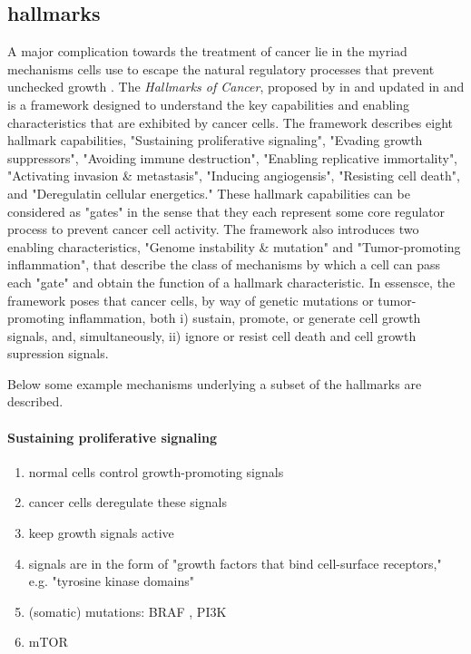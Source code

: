 \subsection{hallmarks}
A major complication towards the treatment of cancer lie in the myriad mechanisms cells use to escape the natural regulatory processes that prevent unchecked growth \cite{need}.
The \emph{Hallmarks of Cancer}, proposed by \citeauthor{foo} in \citeyear{foo} and updated in \citeyear{foo} and \citeyear{foo} is a framework designed to understand the key capabilities and enabling characteristics that are exhibited by cancer cells.
The framework describes eight hallmark capabilities,
"Sustaining proliferative signaling", 
"Evading growth suppressors",
"Avoiding immune destruction",
"Enabling replicative immortality",
"Activating invasion \& metastasis",
"Inducing angiogensis",
"Resisting cell death",
and "Deregulatin cellular energetics."
These hallmark capabilities can be considered as "gates" in the sense that they each represent some core regulator process to prevent cancer cell activity.
The framework also introduces two enabling characteristics, "Genome instability \& mutation" and "Tumor-promoting inflammation", that describe the class of mechanisms by which a cell can pass each "gate" and obtain the function of a hallmark characteristic.
In essensce, the framework poses that cancer cells, by way of genetic mutations or tumor-promoting inflammation, both
i) sustain, promote, or generate cell growth signals, and, simultaneously,
ii) ignore or resist cell death and cell growth supression signals.

Below some example mechanisms underlying a subset of the hallmarks are described.

\paragraph{Sustaining proliferative signaling}
\begin{enumerate}
  \item normal cells control growth-promoting signals
  \item cancer cells deregulate these signals
  \item keep growth signals active
  \item signals are in the form of "growth factors that bind cell-surface receptors," e.g. "tyrosine kinase domains"
  \item (somatic) mutations: BRAF \cite{davies2010}, PI3K \cite{jiang2009,yuan2008}
  \item mTOR %
\end{enumerate}


